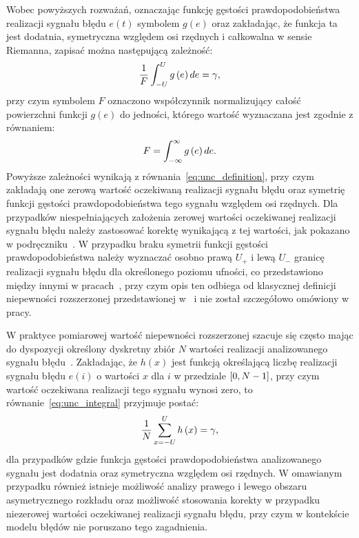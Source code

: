 Wobec powyższych rozważań, oznaczając funkcję gęstości prawdopodobieństwa realizacji sygnału błędu $e(t)$ symbolem $g(e)$ oraz zakładając, że funkcja ta jest dodatnia, symetryczna względem osi rzędnych i całkowalna w sensie Riemanna, zapisać można następującą zależność:
\begin{equation}
\frac{1}{F} \int _{-U} ^{U} g \left(e\right) de = \gamma \label{eq:unc_integral},
\end{equation}
przy czym symbolem $F$ oznaczono współczynnik normalizujący całość powierzchni funkcji $g(e)$ do jedności, którego wartość wyznaczana jest zgodnie z równaniem:
\begin{equation}
F = \int _{-\infty} ^{\infty} g \left(e\right) de \label{eq:unc_normalizer_int}.
\end{equation}
Powyższe zależności wynikają z równania~\eqref{eq:unc_definition}, przy czym zakładają one zerową wartość oczekiwaną realizacji sygnału błędu oraz symetrię funkcji gęstości prawdopodobieństwa tego sygnału względem osi rzędnych. Dla przypadków niespełniających założenia zerowej wartości oczekiwanej realizacji sygnału błędu należy zastosować korektę wynikającą z tej wartości, jak pokazano w podręczniku~\cite{jakubiec_system}. W przypadku braku symetrii funkcji gęstości prawdopodobieństwa należy wyznaczać osobno prawą $U_{+}$ i lewą $U_{-}$ granicę realizacji sygnału błędu dla określonego poziomu ufności, co przedstawiono między innymi w pracach~\cite{roj_annuncertainty, wymyslo_range}, przy czym opis ten odbiega od klasycznej definicji niepewności rozszerzonej przedstawionej w~\cite{jcgm_guide} i nie został szczegółowo omówiony w pracy.

W praktyce pomiarowej wartość niepewności rozszerzonej szacuje się często mając do dyspozycji określony dyskretny zbiór $N$ wartości realizacji analizowanego sygnału błędu~\cite{jcgm_guide}. Zakładając, że $h(x)$ jest funkcją określającą liczbę realizacji sygnału błędu $e(i)$ o wartości $x$ dla $i$ w przedziale $\interval{0}{N-1}$, przy czym wartość oczekiwana realizacji tego sygnału wynosi zero, to równanie~\eqref{eq:unc_integral} przyjmuje postać:
\begin{equation}
\frac{1}{N} \sum _{x=-U} ^{U} h \left(x\right) = \gamma \label{eq:unc_summation},
\end{equation}
dla przypadków gdzie funkcja gęstości prawdopodobieństwa analizowanego sygnału jest dodatnia oraz symetryczna względem osi rzędnych. W omawianym przypadku również istnieje możliwość analizy prawego i lewego obszaru asymetrycznego rozkładu oraz możliwość stosowania korekty w przypadku niezerowej wartości oczekiwanej realizacji sygnału błędu, przy czym w kontekście modelu błędów nie poruszano tego zagadnienia.

